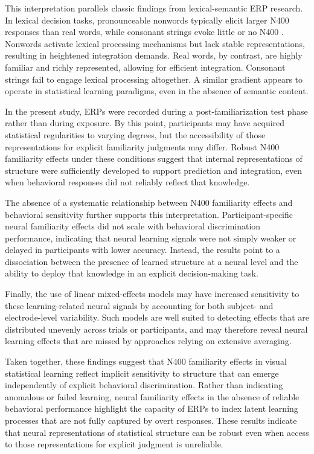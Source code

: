 This interpretation parallels classic findings from lexical-semantic ERP research. In lexical decision tasks, pronounceable nonwords typically elicit larger N400 responses than real words, while consonant strings evoke little or no N400 \cite{kutasThirtyYearsCounting2011}. Nonwords activate lexical processing mechanisms but lack stable representations, resulting in heightened integration demands. Real words, by contrast, are highly familiar and richly represented, allowing for efficient integration. Consonant strings fail to engage lexical processing altogether. A similar gradient appears to operate in statistical learning paradigms, even in the absence of semantic content.

In the present study, ERPs were recorded during a post-familiarization test phase rather than during exposure. By this point, participants may have acquired statistical regularities to varying degrees, but the accessibility of those representations for explicit familiarity judgments may differ. Robust N400 familiarity effects under these conditions suggest that internal representations of structure were sufficiently developed to support prediction and integration, even when behavioral responses did not reliably reflect that knowledge.

The absence of a systematic relationship between N400 familiarity effects and behavioral sensitivity further supports this interpretation. Participant-specific neural familiarity effects did not scale with behavioral discrimination performance, indicating that neural learning signals were not simply weaker or delayed in participants with lower accuracy. Instead, the results point to a dissociation between the presence of learned structure at a neural level and the ability to deploy that knowledge in an explicit decision-making task.

Finally, the use of linear mixed-effects models may have increased sensitivity to these learning-related neural signals by accounting for both subject- and electrode-level variability. Such models are well suited to detecting effects that are distributed unevenly across trials or participants, and may therefore reveal neural learning effects that are missed by approaches relying on extensive averaging.

Taken together, these findings suggest that N400 familiarity effects in visual statistical learning reflect implicit sensitivity to structure that can emerge independently of explicit behavioral discrimination. Rather than indicating anomalous or failed learning, neural familiarity effects in the absence of reliable behavioral performance highlight the capacity of ERPs to index latent learning processes that are not fully captured by overt responses. These results indicate that neural representations of statistical structure can be robust even when access to those representations for explicit judgment is unreliable.


